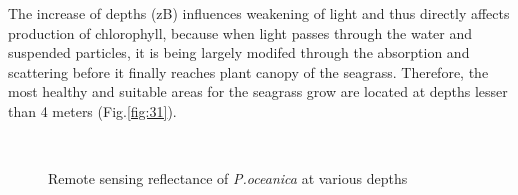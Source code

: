 \documentclass[10pt, a4paper]{article}
\begin{document}
The increase of depths (zB) influences weakening of light and thus directly affects
production of chlorophyll, because when light passes through the water and suspended particles, it is
being largely modifed through the absorption and scattering before it finally reaches plant canopy of
the seagrass. Therefore, the most healthy and suitable areas for the seagrass grow are located at depths
lesser than 4 meters (Fig.\ref{fig:31}).

\begin{figure}[h]
	\centering
	\\
	\caption{Remote sensing reflectance of \textit{P.oceanica} at various depths}
	\label{fig:32}
\end{figure}
\end{document}
